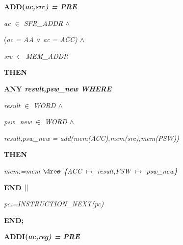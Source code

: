 \begin{sloppypar}
\hspace*{0.10in}  

\hspace*{0.10in}

\hspace*{0.10in}

\hspace*{0.10in}

\hspace*{0.10in}

\hspace*{0.10in}\bf ADD\rm (\it ac\rm ,\it src\rm ) \rm = \bf PRE

\hspace*{0.20in}\it ac $\in$  \it SFR\_ADDR  $\land$ 

\hspace*{0.20in}\rm (\it ac \rm = \it AA  $\lor$  \it ac \rm = \it ACC\rm )  $\land$ 

\hspace*{0.20in}\it src $\in$  \it MEM\_ADDR

\hspace*{0.10in}\bf THEN

\hspace*{0.20in}\bf ANY \it result\rm ,\it psw\_new \bf WHERE

\hspace*{0.30in}\it result $\in$  \it WORD  $\land$ 

\hspace*{0.30in}\it psw\_new $\in$  \it WORD  $\land$ 

\hspace*{0.30in}\it result\rm ,\it psw\_new \rm = \it add\rm (\it mem\rm (\it ACC\rm )\rm ,\it mem\rm (\it src\rm )\rm ,\it mem\rm (\it PSW\rm )\rm )

\hspace*{0.20in}\bf THEN

\hspace*{0.30in}\it mem\rm :=\it mem $\lover$ \rm \{\it ACC $\mapsto$ \it result\rm ,\it PSW $\mapsto$ \it psw\_new\rm \}

\hspace*{0.20in}\bf END  $\mbox{$\mid\mid$}$ 

\hspace*{0.20in}\it pc\rm :=\it INSTRUCTION\_NEXT\rm (\it pc\rm )

\hspace*{0.10in}\bf END\rm ;

\hspace*{0.10in}\bf ADDI\rm (\it ac\rm ,\it reg\rm ) \rm = \bf PRE


\end{sloppypar}
